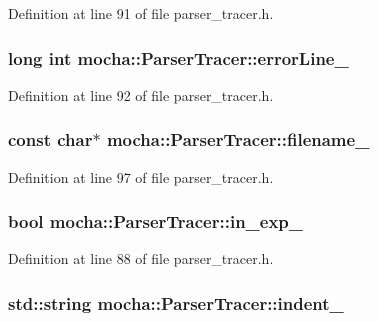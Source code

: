 Definition at line 91 of file parser\_\-tracer.h.

\hypertarget{classmocha_1_1_parser_tracer_a0d4c2ee1918d1e59ce45779853e462e5}{
\subsubsection[{errorLine\_\-}]{\setlength{\rightskip}{0pt plus 5cm}long int {\bf mocha::ParserTracer::errorLine\_\-}}}
\label{classmocha_1_1_parser_tracer_a0d4c2ee1918d1e59ce45779853e462e5}


Definition at line 92 of file parser\_\-tracer.h.

\hypertarget{classmocha_1_1_parser_tracer_ae45e8a1683a3ac121218fdad7b6b9bc2}{
\subsubsection[{filename\_\-}]{\setlength{\rightskip}{0pt plus 5cm}const char$\ast$ {\bf mocha::ParserTracer::filename\_\-}}}
\label{classmocha_1_1_parser_tracer_ae45e8a1683a3ac121218fdad7b6b9bc2}


Definition at line 97 of file parser\_\-tracer.h.

\hypertarget{classmocha_1_1_parser_tracer_ab3d8cd46853e02d0318b932a4d2e271a}{
\subsubsection[{in\_\-exp\_\-}]{\setlength{\rightskip}{0pt plus 5cm}bool {\bf mocha::ParserTracer::in\_\-exp\_\-}}}
\label{classmocha_1_1_parser_tracer_ab3d8cd46853e02d0318b932a4d2e271a}


Definition at line 88 of file parser\_\-tracer.h.

\hypertarget{classmocha_1_1_parser_tracer_a423db07998b1298089cd5e6daa330d3b}{
\subsubsection[{indent\_\-}]{\setlength{\rightskip}{0pt plus 5cm}std::string {\bf mocha::ParserTracer::indent\_\-}}}
\label{classmocha_1_1_parser_tracer_a423db07998b1298089cd5e6daa330d3b}


